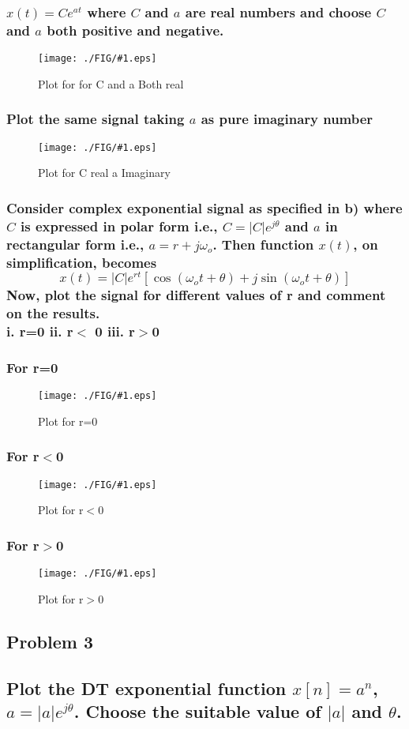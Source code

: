 \documentclass[a4paper,11pt]{article}
\newcommand{\mobs}[2]{
    \begin{figure}[H]
        \centering
        \texttt{[image: ./FIG/\#1.eps]}
        \caption{#2}
    \end{figure}
   
}
\begin{document}
\subsubsection*{$x(t)=Ce^{at}$ where $C$ and $a$ are real numbers and choose $C$ and $a$ both positive and negative.}
\mobs{ca_real}{Plot for for C and a  Both real}

\subsubsection*{Plot the same signal taking $a$ as pure imaginary number}
\mobs{a_imag}{Plot for C real a Imaginary}


\subsubsection*{Consider complex exponential signal as specified in b) where $C$ is expressed in polar form i.e., $C=|C|e^{j\theta}$ and $a$ in rectangular form i.e., $a=r+j\omega_o$. Then function $x(t)$, on simplification, becomes $$ x(t)= |C|e^{rt}[\cos(\omega_o t+\theta)+j\sin(\omega_o t+\theta)]$$
Now, plot the signal for different values of r and comment on the results.\\
i. r=0 \quad \quad ii. r$<$ 0 \quad \quad iii. r$>$0}


\subsubsection{For r=0}
\mobs{r0}{Plot for r=0}

\subsubsection{For r$<$0}
\mobs{rm1}{Plot for r$<$0}

\subsubsection{For r$>$0}
\mobs{r1}{Plot for r$>$0}


\subsection{Problem 3}
\subsection*{Plot the DT exponential function $x[n]=a^n$, $a=|a|e^{j\theta}$. Choose the suitable value of $|a|$ and $\theta$.}
\end{document}
